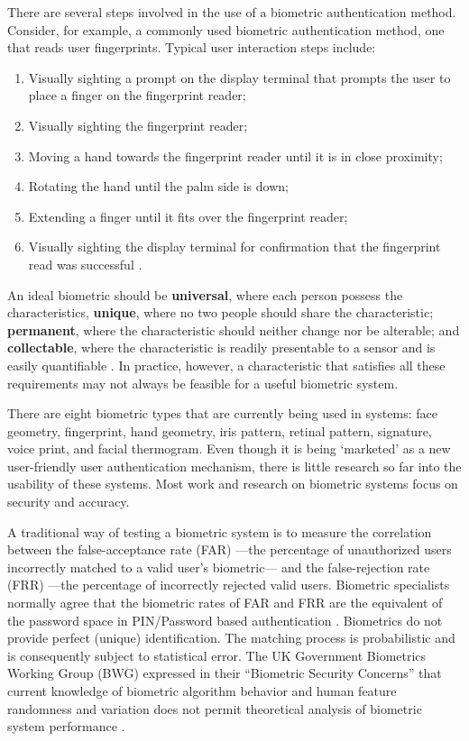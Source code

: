 \documentclass{article}
\begin{document}
There are several steps involved in the use of a biometric authentication method. Consider, for example, a commonly used biometric authentication method, one that reads user fingerprints. Typical user interaction steps include:
\begin{enumerate}
\item Visually sighting a prompt on the display terminal that prompts the user to place a finger on the fingerprint reader;
\item Visually sighting the fingerprint reader;
\item Moving a hand towards the fingerprint reader until it is in close proximity;
\item Rotating the hand until the palm side is down;
\item Extending a finger until it fits over the fingerprint reader;
\item Visually sighting the display terminal for confirmation that the fingerprint read was successful \cite{schultz2001usability}.
\end{enumerate}

An ideal biometric should be \textbf{universal}, where each person possess the characteristics, \textbf{unique}, where no two people should share the characteristic; \textbf{permanent}, where the characteristic should neither change nor be alterable; and \textbf{collectable}, where the characteristic is readily presentable to a sensor and is easily quantifiable \cite{jain2000biometric}. In practice, however, a characteristic that satisfies all these requirements may not always be feasible for a useful biometric system.

There are eight biometric types that are currently being used in systems: face geometry, fingerprint, hand geometry, iris pattern, retinal pattern, signature, voice print, and facial thermogram. Even though it is being `marketed' as a new user-friendly user authentication mechanism, there is little research so far into the usability of these systems. Most work and research on biometric systems focus on security and accuracy. 

A traditional way of testing a biometric system is to measure the correlation between the false-acceptance rate (FAR) ---the percentage of unauthorized users incorrectly matched to a valid user's biometric--- and the false-rejection rate (FRR) ---the percentage of incorrectly rejected valid users. Biometric specialists normally agree that the biometric rates of FAR and FRR are the equivalent of the password space in PIN/Password based authentication \cite{biometrics2003biometrics}. Biometrics do not provide perfect (unique) identification. The matching process is probabilistic and is consequently subject to statistical error.    The UK Government Biometrics Working Group (BWG) expressed in their “Biometric Security Concerns” that current knowledge of biometric algorithm behavior and human feature randomness and variation does not permit theoretical analysis of biometric system performance \cite{biometrics2003biometrics}.
\end{document}
